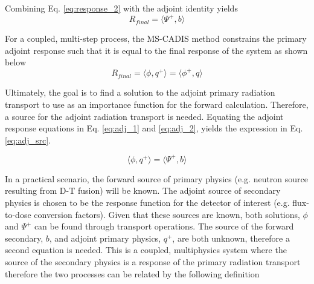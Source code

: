 Combining Eq. \ref{eq:response_2} with the adjoint identity yields
 \begin{equation}\label{eq:adj_2}
	 R_{final} %
		=\langle \Psi^{+} , b \rangle
 \end{equation}

For a coupled, multi-step process, the MS-CADIS method 
constrains the primary adjoint response such that it is equal to  
the final response of the system
as shown below
 \begin{equation}\label{eq:adj_1}
	 R_{final} = \langle \phi, q^{+} \rangle =
		\langle \phi^{+} , q \rangle
 \end{equation}

	 
 

Ultimately, the goal is to find a solution to the adjoint
primary radiation transport to use as an importance
function for the forward calculation. Therefore, a
source for the adjoint radiation transport is needed.  Equating the adjoint
response equations in Eq. \ref{eq:adj_1} and \ref{eq:adj_2}, yields the expression in Eq.
\ref{eq:adj_src}.

 \begin{equation}\label{eq:adj_src}
	 \langle \phi, q^{+} \rangle =
	 \langle \Psi^{+}, b \rangle
 \end{equation}

In a practical scenario, the forward source of primary physics (e.g. neutron
source resulting from D-T fusion) will be known.  
The adjoint source of secondary physics is chosen to be the response function for the
detector of interest (e.g. flux-to-dose conversion factors).
Given that these sources are known, both solutions, $ \phi $ and
$\Psi^{+} $ can be found through transport operations.
The source of the forward secondary, $b$,  and adjoint primary physics,
$q^{+}$, are both unknown, therefore a second equation is needed.  
This is a coupled, multiphysics system where the source of the secondary physics is
a response of the primary radiation transport therefore the two processes can be related
by the following definition%

